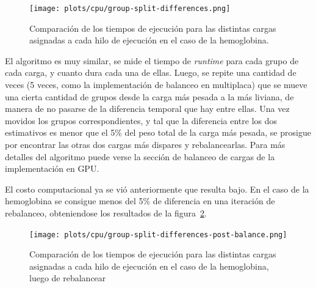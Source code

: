 \begin{figure}[htbp]
   \centering
   \texttt{[image: plots/cpu/group-split-differences.png]}
   \caption{Comparaci\'on de los tiempos de ejecuci\'on para las distintas
   cargas asignadas a cada hilo de ejecuci\'on en el caso de la hemoglobina.}
   \label{fig:lio-imbalance-between-loads}
\end{figure}

El algoritmo es muy similar, se mide el tiempo de \textit{runtime} para cada
grupo de cada carga, y cuanto dura cada una de ellas. Luego, se repite una
cantidad de veces (5 veces, como la implementaci\'on de balanceo en multiplaca)
que se mueve una cierta cantidad de grupos desde la carga m\'as pesada a la
m\'as liviana, de manera de no pasarse de la diferencia temporal que hay entre
ellas. Una vez movidos los grupos correspondientes, y tal que la diferencia
entre los dos estimativos es menor que el 5\% del peso total de la carga m\'as
pesada, se prosigue por encontrar las otras dos cargas m\'as dispares y
rebalancearlas. Para m\'as detalles del algoritmo puede verse la secci\'on
de balanceo de cargas de la implementaci\'on en GPU.

El costo computacional ya se vi\'o anteriormente que resulta bajo. En el caso
de la hemoglobina se consigue menos del 5\% de diferencia en una iteraci\'on
de rebalanceo, obteniendose los resultados de la figura~\ref{fig:lio-imbalance-fixed}.


\begin{figure}[htbp]
   \centering
   \texttt{[image: plots/cpu/group-split-differences-post-balance.png]}
   \caption{Comparaci\'on de los tiempos de ejecuci\'on para las distintas
   cargas asignadas a cada hilo de ejecuci\'on en el caso de la hemoglobina,
   luego de rebalancear}
   \label{fig:lio-imbalance-fixed}
\end{figure}
